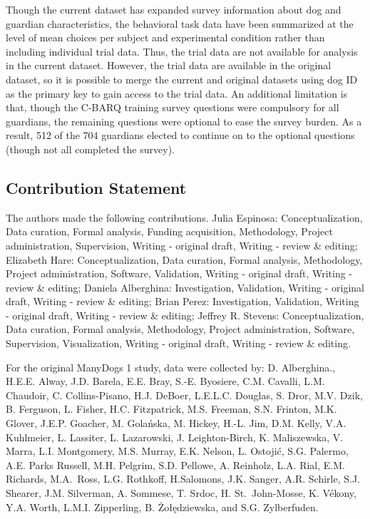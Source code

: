 \documentclass[
  man,floatsintext]{apa6}
\begin{document}
Though the current dataset has expanded survey information about dog and guardian characteristics, the behavioral task data have been summarized at the level of mean choices per subject and experimental condition rather than including individual trial data. Thus, the trial data are not available for analysis in the current dataset. However, the trial data are available in the original dataset, so it is possible to merge the current and original datasets using dog ID as the primary key to gain access to the trial data. An additional limitation is that, though the C-BARQ training survey questions were compulsory for all guardians, the remaining questions were optional to ease the survey burden. As a result, 512 of the 704 guardians elected to continue on to the optional questions (though not all completed the survey).

\hypertarget{contribution-statement}{%
\subsection{Contribution Statement}\label{contribution-statement}}

The authors made the following contributions. Julia Espinosa: Conceptualization, Data curation, Formal analysis, Funding acquisition, Methodology, Project administration, Supervision, Writing - original draft, Writing - review \& editing; Elizabeth Hare: Conceptualization, Data curation, Formal analysis, Methodology, Project administration, Software, Validation, Writing - original draft, Writing - review \& editing; Daniela Alberghina: Investigation, Validation, Writing - original draft, Writing - review \& editing; Brian Perez: Investigation, Validation, Writing - original draft, Writing - review \& editing; Jeffrey R. Stevens: Conceptualization, Data curation, Formal analysis, Methodology, Project administration, Software, Supervision, Visualization, Writing - original draft, Writing - review \& editing.

For the original ManyDogs 1 study, data were collected by: D. Alberghina., H.E.E. Alway, J.D. Barela, E.E. Bray, S.-E. Byosiere, C.M. Cavalli, L.M. Chaudoir, C. Collins-Pisano, H.J. DeBoer, L.E.L.C. Douglas, S. Dror, M.V. Dzik, B. Ferguson, L. Fisher, H.C. Fitzpatrick, M.S. Freeman, S.N. Frinton, M.K. Glover, J.E.P. Goacher, M. Golańska, M.
Hickey, H.-L. Jim, D.M. Kelly, V.A. Kuhlmeier, L. Lassiter, L. Lazarowski, J. Leighton-Birch, K. Maliszewska, V. Marra, L.I. Montgomery, M.S. Murray, E.K. Nelson, L. Ostojić, S.G. Palermo, A.E. Parks Russell, M.H. Pelgrim, S.D. Pellowe, A. Reinholz, L.A. Rial, E.M. Richards, M.A.~Ross, L.G. Rothkoff, H.Salomons, J.K. Sanger, A.R. Schirle, S.J. Shearer, J.M. Silverman, A. Sommese, T. Srdoc, H. St.~John-Mosse, K. Vékony, Y.A. Worth, L.M.I. Zipperling, B. Żołędziewska, and S.G. Zylberfuden.
\end{document}

